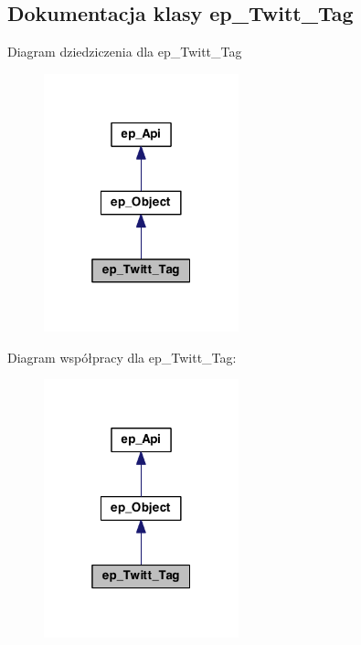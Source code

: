 \hypertarget{classep___twitt___tag}{\subsection{Dokumentacja klasy ep\-\_\-\-Twitt\-\_\-\-Tag}
\label{classep___twitt___tag}
}


Diagram dziedziczenia dla ep\-\_\-\-Twitt\-\_\-\-Tag\nopagebreak
\begin{figure}[H]
\begin{center}
\leavevmode
\includegraphics[width=160pt]{classep___twitt___tag__inherit__graph}
\end{center}
\end{figure}


Diagram współpracy dla ep\-\_\-\-Twitt\-\_\-\-Tag\-:\nopagebreak
\begin{figure}[H]
\begin{center}
\leavevmode
\includegraphics[width=160pt]{classep___twitt___tag__coll__graph}
\end{center}
\end{figure}
